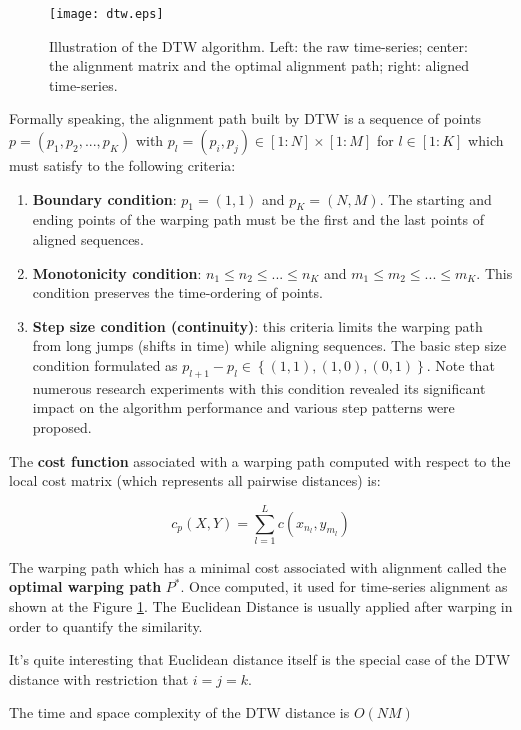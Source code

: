 \begin{figure}[tbp]
   \centering
   \texttt{[image: dtw.eps]}
   \caption{Illustration of the DTW algorithm. Left: the raw time-series; center: the alignment matrix and the optimal alignment path; right: aligned time-series.}
   \label{fig:dtw}
\end{figure} 

Formally speaking, the alignment path built by DTW is a sequence of points $p=(p_{1}, p_{2}, ... , p_{K})$ with $p_{l} = (p_{i}, p_{j}) \in [1:N] \times [1:M]$ for $l \in [1:K]$ which must satisfy to the following criteria:
\begin{enumerate}
	\item \textbf{Boundary condition}: $p_{1}=(1,1)$ and $p_{K}=(N,M)$. The starting and ending points of the warping path must be the first and the last points of aligned sequences.
	\item \textbf{Monotonicity condition}: $n_{1} \leq n_{2} \leq ... \leq n_{K}$ and $m_{1} \leq m_{2} \leq ... \leq m_{K}$. This condition preserves the time-ordering of points.
	\item \textbf{Step size condition (continuity)}: this criteria limits the warping path from long jumps (shifts in time) while aligning sequences. The basic step size condition formulated as $p_{l+1}-p_{l} \in \left\{ (1,1), (1,0), (0,1) \right\}$. Note that numerous research \cite{citeulike:3496861} \cite{citeulike:3578001} \cite{citeulike:603020} \cite{citeulike:3577984} experiments with this condition revealed its significant impact on the algorithm performance and various step patterns were proposed.
\end{enumerate}

The \textbf{cost function} associated with a warping path computed with respect to the local cost matrix (which represents all pairwise distances) is: 

\begin{equation}
\label{eq:pathcost}
c_{p}(X,Y) = \sum_{l=1}^{L} c(x_{n_{l}}, y_{m_{l}})
\end{equation}

The warping path which has a minimal cost associated with alignment called the \textbf{optimal warping path} $P^{*}$. Once computed, it used for time-series alignment as shown at the Figure \ref{fig:dtw}. The Euclidean Distance is usually applied after warping in order to quantify the similarity.

It's quite interesting that Euclidean distance itself is the special case of the DTW distance with restriction that $i=j=k$.

The time and space complexity of the DTW distance is $O(NM)$
